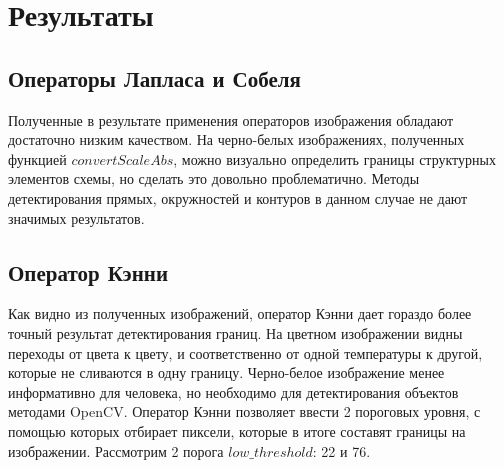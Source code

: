 \section{Результаты}




\subsection{Операторы Лапласа и Собеля}




Полученные в результате применения операторов изображения обладают достаточно низким качеством. На черно-белых изображениях, полученных функцией $convertScaleAbs$, можно визуально определить границы структурных элементов схемы, но сделать это довольно проблематично. Методы детектирования прямых, окружностей и контуров в данном случае не дают значимых результатов.


\subsection{Оператор Кэнни}



Как видно из полученных изображений, оператор Кэнни дает гораздо более точный результат детектирования границ. На цветном изображении видны переходы от цвета к цвету, и соответственно от одной температуры к другой, которые не сливаются в одну границу. Черно-белое изображение менее информативно для человека, но необходимо для детектирования объектов методами OpenCV. 
\newline 
Оператор Кэнни позволяет ввести 2 пороговых уровня, с помощью которых отбирает пиксели, которые в итоге составят границы на изображении. Рассмотрим 2 порога $low\_threshold$: 22 и 76.

